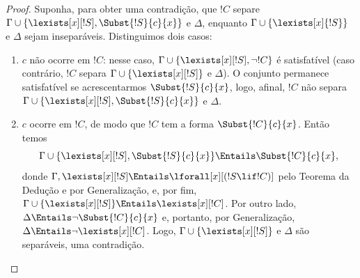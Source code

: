 \documentclass[../../../include/open-logic-section]{subfiles}
\begin{document}
\begin{proof}
Suponha, para obter uma contradição, que $!C$ separe
$\Gamma \cup \{ \lexists[x][!S], \Subst{!S}{c}{x}\}$ e $\Delta$,
enquanto $\Gamma \cup \{\lexists[x]{!S} \}$ e $\Delta$ sejam
inseparáveis. Distinguimos dois casos:
\begin{enumerate}
\item $c$ não ocorre em $!C$: nesse caso,
  $\Gamma \cup \{\lexists[x][!S], \lnot!C \}$ é satisfatível (caso
  contrário, $!C$ separa $\Gamma \cup \{\lexists[x][!S] \}$ e
  $\Delta$). O conjunto permanece satisfatível se acrescentarmos
  $\Subst{!S}{c}{x}$, logo, afinal, $!C$ não separa
  $\Gamma \cup \{ \lexists[x][!S], \Subst{!S}{c}{x} \}$ e $\Delta$.
\item $c$ ocorre em $!C$, de modo que $!C$ tem a forma
  $\Subst{!C}{c}{x}$. Então temos
  \[
  \Gamma \cup \{ \lexists[x][!S], \Subst{!S}{c}{x}\} \Entails \Subst{!C}{c}{x},
  \]
  donde $\Gamma, \lexists[x][!S] \Entails
  \lforall[x][(!S \lif !C)]$ pelo Teorema da Dedução e por
  Generalização, e, por fim,
  $\Gamma \cup \{ \lexists[x][!S] \} \Entails \lexists[x][!C]$. Por
  outro lado, $\Delta \Entails \lnot \Subst{!C}{c}{x}$ e, portanto,
  por Generalização, $\Delta \Entails \lnot \lexists[x][!C]$. Logo,
  $\Gamma \cup \{\lexists[x][!S] \}$ e $\Delta$ são separáveis, uma
  contradição.
\end{enumerate}
\end{proof}
\end{document}

